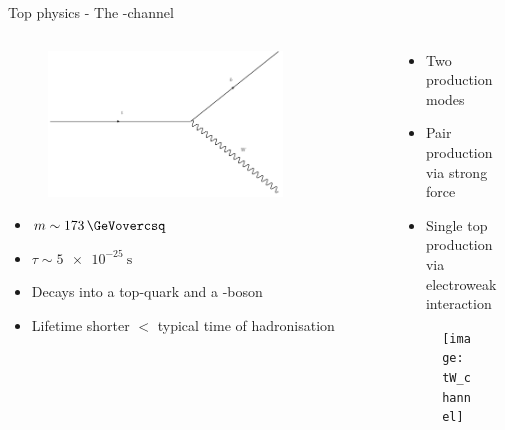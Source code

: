\begin{frame}{Top physics - The \tW-channel}
    \begin{columns}
        \begin{column}{0.5\textwidth}
        \begin{figure}
            \centering
            \includegraphics[width=0.8\textwidth]{figures_theory/t_decay.pdf}
        \end{figure}
        \begin{itemize}
            \item $ m \sim \SI{173}{\GeVovercsq}$
            \vspace{0.2cm}
            \item $\tau \sim \SI{5e-25}{\second}$
            \item Decays into a top-quark and a \PW-boson
            \vspace{0.2cm}
            \item Lifetime shorter $<$ typical time of hadronisation 
        \end{itemize}
        \end{column}
        \begin{column}{0.5\textwidth}
        \begin{itemize}
		\item Two production modes
		\item Pair production via strong force
		\item Single top production via electroweak interaction
        \end{itemize}
        \begin{figure}
            \centering
            \texttt{[image: tW\_channel]}
        \end{figure}
        \end{column}
    \end{columns}
\end{frame}

